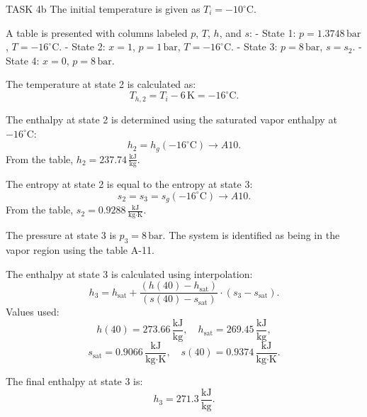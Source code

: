 TASK 4b  
The initial temperature is given as \( T_i = -10^\circ \text{C} \).  

A table is presented with columns labeled \( p \), \( T \), \( h \), and \( s \):  
- State 1: \( p = 1.3748 \, \text{bar} \), \( T = -16^\circ \text{C} \).  
- State 2: \( x = 1 \), \( p = 1 \, \text{bar} \), \( T = -16^\circ \text{C} \).  
- State 3: \( p = 8 \, \text{bar} \), \( s = s_2 \).  
- State 4: \( x = 0 \), \( p = 8 \, \text{bar} \).  

The temperature at state 2 is calculated as:  
\[
T_{h,2} = T_i - 6 \, \text{K} = -16^\circ \text{C}.
\]  

The enthalpy at state 2 is determined using the saturated vapor enthalpy at \( -16^\circ \text{C} \):  
\[
h_2 = h_g(-16^\circ \text{C}) \rightarrow A10.
\]  
From the table, \( h_2 = 237.74 \, \frac{\text{kJ}}{\text{kg}} \).  

The entropy at state 2 is equal to the entropy at state 3:  
\[
s_2 = s_3 = s_g(-16^\circ \text{C}) \rightarrow A10.
\]  
From the table, \( s_2 = 0.9288 \, \frac{\text{kJ}}{\text{kg·K}} \).  

The pressure at state 3 is \( p_3 = 8 \, \text{bar} \).  
The system is identified as being in the vapor region using the table A-11.  

The enthalpy at state 3 is calculated using interpolation:  
\[
h_3 = h_{\text{sat}} + \frac{(h(40) - h_{\text{sat}})}{(s(40) - s_{\text{sat}})} \cdot (s_3 - s_{\text{sat}}).
\]  
Values used:  
\[
h(40) = 273.66 \, \frac{\text{kJ}}{\text{kg}}, \quad h_{\text{sat}} = 269.45 \, \frac{\text{kJ}}{\text{kg}},  
\]  
\[
s_{\text{sat}} = 0.9066 \, \frac{\text{kJ}}{\text{kg·K}}, \quad s(40) = 0.9374 \, \frac{\text{kJ}}{\text{kg·K}}.
\]  

The final enthalpy at state 3 is:  
\[
h_3 = 271.3 \, \frac{\text{kJ}}{\text{kg}}.
\]